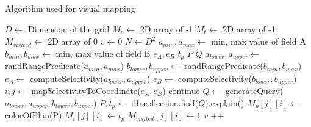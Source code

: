 \begin{algorithm}[htb]
    \caption{Algorithm used for visual mapping}
    \label{alg:vm}
    \begin{algorithmic}
        \STATE $D \gets $ Dimension of the grid 
        \STATE $M_{p} \gets $ 2D array of -1
        \STATE {}
        \STATE $M_{t} \gets $ 2D array of -1
        \STATE {}
        \STATE $M_{visited} \gets $ 2D array of 0
        \STATE {}
        \STATE $v \gets 0$  
        \STATE $N \gets D^2$  
        \STATE $a_{min}, a_{max} \gets$  min, max value of field A
        \STATE $b_{min}, b_{max} \gets$  min, max value of field B
        \STATE $e_A, e_B $ 
        \STATE $t_p$ 
        \STATE $P$ 
        \STATE $Q$ 
        \STATE
            \STATE $a_{lower}, a_{upper} \gets$ randRangePredicate($a_{min}, a_{max}$)
            \STATE $b_{lower}, b_{upper} \gets$ randRangePredicate($b_{min}, b_{max}$)
            \STATE $e_A \gets$ computeSelectivity($a_{lower}, a_{upper}$)
            \STATE $e_B \gets$ computeSelectivity($b_{lower}, b_{upper}$)
            \STATE $i, j \gets$ mapSelectivityToCoordinate($e_A, e_B$)
            \STATE 
                \STATE continue
            \ENDIF
            \STATE
            \STATE $Q \gets$ generateQuery($a_{lower}, a_{upper}, b_{lower}, b_{upper}$)
            \STATE $P, t_p\gets$  db.collection.find($Q$).explain()
            \STATE
            \STATE $M_{p}[j][i] \gets$ colorOfPlan(P)
            \STATE
            \STATE $M_{t}[j][i] \gets t_p$ 
            \STATE $M_{visited}[j][i] \gets 1$
            \STATE $v$ ++
            
        \ENDWHILE
        
    \end{algorithmic}
    \label{alg:map}
\end{algorithm}

